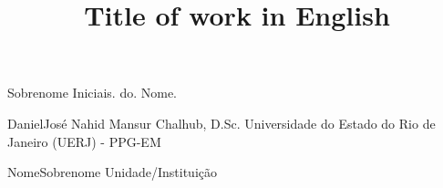 \documentclass{repUERJ}
\begin{document}
      {Sobrenome}
      {Iniciais. do. Nome.} %

\title{Title of work in English}





           {Daniel}{José Nahid Mansur Chalhub, D.Sc.} %
           {Universidade do Estado do Rio de Janeiro (UERJ) - PPG-EM} %

           {Nome}{Sobrenome} %
           {Unidade/Instituição} %


\newcommand{\ggrau}{Master}

\grau{\ggrau}


\newcommand{\cursoPT}{Engenharia Mecânica} %



\newcommand{\areadeconcentracaoPT}{Fenômenos de Transporte}




\newcommand{\localPT}{Rio de Janeiro, Brasil} %

\newcommand{\dataPT}{DD de MMMMMM de AAAA} %
\end{document}
